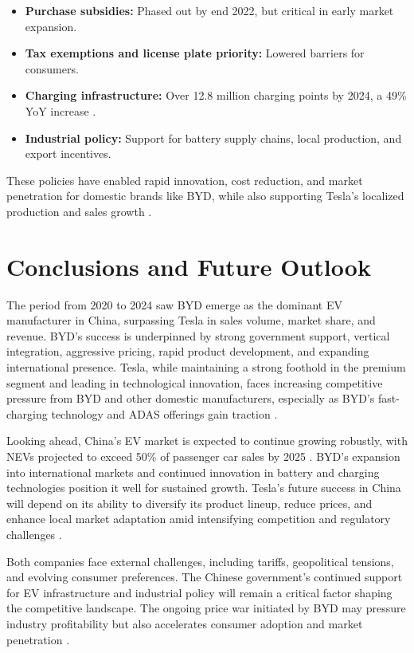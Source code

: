 \documentclass{article}
\begin{document}
\begin{itemize}
    \item \textbf{Purchase subsidies:} Phased out by end 2022, but critical in early market expansion.
    \item \textbf{Tax exemptions and license plate priority:} Lowered barriers for consumers.
    \item \textbf{Charging infrastructure:} Over 12.8 million charging points by 2024, a 49\% YoY increase \citep{argus2024}.
    \item \textbf{Industrial policy:} Support for battery supply chains, local production, and export incentives.
\end{itemize}

These policies have enabled rapid innovation, cost reduction, and market penetration for domestic brands like BYD, while also supporting Tesla's localized production and sales growth \citep{techreview2023,sciencedirect2024,csis2024}.

\section{Conclusions and Future Outlook}

The period from 2020 to 2024 saw BYD emerge as the dominant EV manufacturer in China, surpassing Tesla in sales volume, market share, and revenue. BYD's success is underpinned by strong government support, vertical integration, aggressive pricing, rapid product development, and expanding international presence. Tesla, while maintaining a strong foothold in the premium segment and leading in technological innovation, faces increasing competitive pressure from BYD and other domestic manufacturers, especially as BYD's fast-charging technology and ADAS offerings gain traction \citep{cnn2025,investors2024,reuters2025}.

Looking ahead, China's EV market is expected to continue growing robustly, with NEVs projected to exceed 50\% of passenger car sales by 2025 \citep{techinasia2025}. BYD's expansion into international markets and continued innovation in battery and charging technologies position it well for sustained growth. Tesla's future success in China will depend on its ability to diversify its product lineup, reduce prices, and enhance local market adaptation amid intensifying competition and regulatory challenges \citep{techinasia2025,argus2024}.

Both companies face external challenges, including tariffs, geopolitical tensions, and evolving consumer preferences. The Chinese government's continued support for EV infrastructure and industrial policy will remain a critical factor shaping the competitive landscape. The ongoing price war initiated by BYD may pressure industry profitability but also accelerates consumer adoption and market penetration \citep{onglobal2025}.
\end{document}
